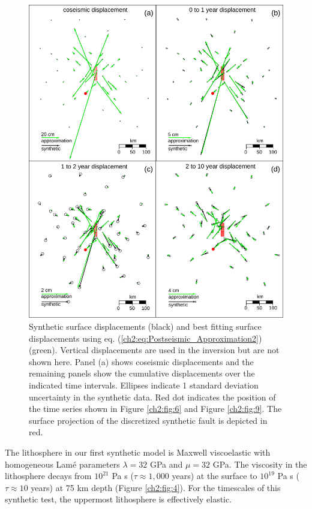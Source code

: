 \begin{figure}
\includegraphics{ch2/figures/Fig5.pdf}
\caption{Synthetic surface displacements (black) and best fitting
surface displacements using eq.
(\ref{ch2:eq:Postseismic_Approximation2}) (green).  Vertical
displacements are used in the inversion but are not shown here. Panel
(a) shows coseismic displacements and the remaining panels show the
cumulative displacements over the indicated time intervals. Ellipses
indicate 1 standard deviation uncertainty in the synthetic data. Red
dot indicates the position of the time series shown in Figure
\ref{ch2:fig:6} and Figure \ref{ch2:fig:9}. The surface projection of
the discretized synthetic fault is depicted in red.}
\label{ch2:fig:5}
\end{figure}

The lithosphere in our first synthetic model is Maxwell viscoelastic
with homogeneous Lam\'e parameters $\lambda = 32$ GPa and $\mu = 32$
GPa.  The viscosity in the lithosphere decays from $10^{21}$ Pa s
($\tau\approx1,000$ years) at the surface to $10^{19}$ Pa s
($\tau\approx10$ years) at 75 km depth (Figure \ref{ch2:fig:4}).  For
the timescales of this synthetic test, the uppermost lithosphere is
effectively elastic.

